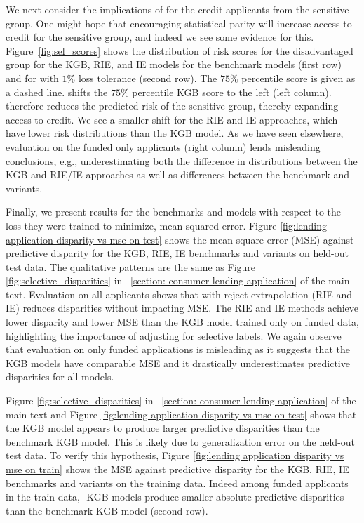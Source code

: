 \documentclass{article}
\begin{document}
We next consider the implications of \fairs for the credit applicants from the sensitive group. One might hope that encouraging statistical parity will increase access to credit for the sensitive group, and indeed we see some evidence for this.
Figure~\ref{fig:sel_scores} shows the distribution of risk scores for the disadvantaged group for the KGB, RIE, and IE models for the benchmark models (first row) and for \fairs with $1\%$ loss tolerance (second row). The $75\%$ percentile score is given as a dashed line. 
\fairs shifts the $75\%$ percentile KGB score to the left (left column). \fairs therefore reduces the predicted risk of the sensitive group, thereby expanding access to credit. We see a smaller shift for the RIE and IE approaches, which have lower risk distributions than the KGB model.
As we have seen elsewhere, evaluation on the funded only applicants (right column) lends misleading conclusions, e.g., underestimating both the difference in distributions between the KGB and RIE/IE approaches as well as differences between the benchmark and \fairs variants. 

Finally, we present results for the benchmarks and \fairs models with respect to the loss they were trained to minimize, mean-squared error. 
Figure \ref{fig:lending application disparity vs mse on test} shows the mean square error (MSE) against predictive disparity for the KGB, RIE, IE benchmarks and \fairs variants on held-out test data. The qualitative patterns are the same as Figure \ref{fig:selective_disparities} in \textsection~\ref{section: consumer lending application} of the main text. Evaluation on all applicants shows that \fairs with reject extrapolation (RIE and IE) reduces disparities without impacting MSE. The RIE and IE methods achieve lower disparity and lower MSE than the KGB model trained only on funded data,  highlighting the importance of adjusting for selective labels. We again observe that evaluation on only funded applications is misleading as it suggests that the KGB models have comparable MSE and it drastically underestimates predictive disparities for all models. 

Figure \ref{fig:selective_disparities} in \textsection~\ref{section: consumer lending application} of the main text and Figure \ref{fig:lending application disparity vs mse on test} shows that the \fairs KGB model appears to produce larger predictive disparities than the benchmark KGB model. This is likely due to generalization error on the held-out test data. To verify this hypothesis, Figure \ref{fig:lending application disparity vs mse on train} shows the MSE against predictive disparity for the KGB, RIE, IE benchmarks and \fairs variants on the training data. Indeed among funded applicants in the train data, \fairs-KGB models produce smaller absolute predictive disparities than the benchmark KGB model (second row).
\end{document}
